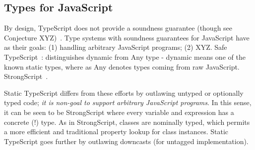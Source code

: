 











\subsection{Types for JavaScript}

By design, TypeScript does not provide a soundness guarantee (though see Conjecture XYZ)~\cite{BiermanAT14}.
Type systems with soundness guarantees for JavaScript have as their
goals: (1) handling arbitrary JavaScript programs; (2) XYZ.
Safe TypeScript~\cite{SafeTypeScript15}: distinguishes dynamic from Any type - dynamic means
one of the known static types, where as Any denotes types coming
from raw JavaScript.
StrongScript~\cite{StrongScriptECOOP15}.

Static TypeScript differs from these efforts by outlawing untyped or optionally typed
code; \emph{it is non-goal to support arbitrary JavaScript programs}.
In this sense, it can be seen to be StrongScript where every variable and 
expression has a concrete (!) type.   As in StrongScript, classes are nominally typed,
which permits a more efficient and traditional property lookup for class instances. 
Static TypeScript goes further by outlawing downcasts (for untagged implementation).

